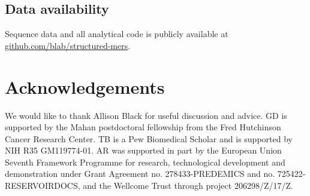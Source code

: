 \documentclass[11pt,oneside,letterpaper]{article}
\begin{document}

\subsection*{Data availability}
Sequence data and all analytical code is publicly available at \href{https://github.com/blab/structured-mers}{github.com/blab/structured-mers}.

\section*{Acknowledgements}
We would like to thank Allison Black for useful discussion and advice.
GD is supported by the Mahan postdoctoral fellowship from the Fred Hutchinson Cancer Research Center.
TB is a Pew Biomedical Scholar and is supported by NIH R35 GM119774-01.
AR was supported in part by the European Union Seventh Framework Programme for research, technological development and demonstration under Grant Agreement no. 278433-PREDEMICS and no. 725422-RESERVOIRDOCS, and the Wellcome Trust through project 206298/Z/17/Z.
\end{document}
